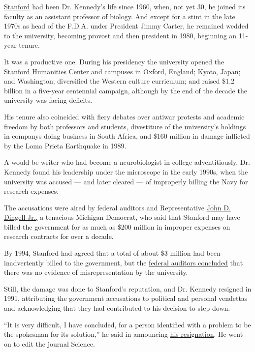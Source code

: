 \href{https://www.stanford.edu/}{Stanford} had been Dr. Kennedy's life
since 1960, when, not yet 30, he joined its faculty as an assistant
professor of biology. And except for a stint in the late 1970s as head
of the F.D.A. under President Jimmy Carter, he remained wedded to the
university, becoming provost and then president in 1980, beginning an
11-year tenure.

It was a productive one. During his presidency the university opened the
\href{http://shc.stanford.edu/}{Stanford Humanities Center} and campuses
in Oxford, England; Kyoto, Japan; and Washington; diversified the
Western culture curriculum; and raised \$1.2 billion in a five-year
centennial campaign, although by the end of the decade the university
was facing deficits.

His tenure also coincided with fiery debates over antiwar protests and
academic freedom by both professors and students, divestiture of the
university's holdings in companys doing business in South Africa, and
\$160 million in damage inflicted by the Loma Prieta Earthquake in 1989.

A would-be writer who had become a neurobiologist in college
adventitiously, Dr. Kennedy found his leadership under the microscope in
the early 1990s, when the university was accused --- and later cleared
--- of improperly billing the Navy for research expenses.

The accusations were aired by federal auditors and Representative
\href{https://www.nytimes3xbfgragh.onion/2019/02/07/us/politics/john-dingell-dead-longest-congressman.html}{John
D. Dingell Jr.,} a tenacious Michigan Democrat, who said that Stanford
may have billed the government for as much as \$200 million in improper
expenses on research contracts for over a decade.

By 1994, Stanford had agreed that a total of about \$3 million had been
inadvertently billed to the government, but the
\href{https://www.nytimes3xbfgragh.onion/1994/10/19/us/navy-settles-a-fraud-case-on-stanford-research-costs.html}{federal
auditors concluded} that there was no evidence of misrepresentation by
the university.

Still, the damage was done to Stanford's reputation, and Dr. Kennedy
resigned in 1991, attributing the government accusations to political
and personal vendettas and acknowledging that they had contributed to
his decision to step down.

``It is very difficult, I have concluded, for a person identified with a
problem to be the spokesman for its solution,'' he said in announcing
\href{https://www.nytimes3xbfgragh.onion/1991/07/30/us/stanford-chief-quits-amid-furor-on-use-of-federal-money.html}{his
resignation}. He went on to edit the journal Science.

